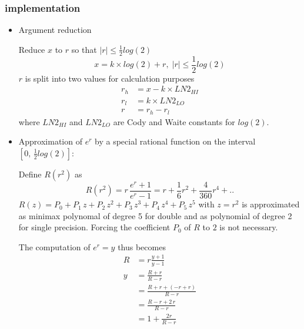 \documentclass[10pt,a4paper]{article}
\numberwithin{equation}{subsection}
\begin{document}
\subsubsection{implementation}
\begin{itemize}
\item Argument reduction

    Reduce $x$ to $r$ so that $ |r| \le \frac{1}{2} log(2) $
    \begin{equation}
        x = k \times log(2) + r, \; |r| \le \frac{1}{2} log(2)
    \end{equation}
    $r$ is split into two values for calculation purposes
    \[
       \begin{aligned}
       r_h &= x - k \times LN2_{HI} \\
       r_l &= k \times LN2_{LO} \\
       r &= r_h - r_l
       \end{aligned}
    \]
    where $LN2_{HI}$ and $LN2_{LO}$ are Cody and Waite constants for $log(2)$.

\item Approximation of $e^r$ by a special rational function on the interval
    $[0,\,\frac{1}{2}log(2)]$:

    Define $ R(r^2) $ as
    \begin{equation}
        R(r^2) = r \, \frac{e^r+1}{e^r-1}
               = r + \frac{1}{6}r^2 + \frac{4}{360}r^4 + ..
    \end{equation}
    $ R(z) = P_0 + P_1\, z + P_2\,z^2 + P_3\,z^3 + P_4\,z^4+ P_5\, z^5$
    with $z = r^2$ is approximated as minimax polynomal of degree 5 for double
    and as polynomial of degree 2 for single precision.
    Forcing the coefficient $P_0$ of $R$ to $2$ is not necessary.

    The computation of $e^r=y$ thus becomes
    \[
        \begin{aligned}
            R &= r \frac{y+1}{y-1} \\
            y &= \frac{R+r}{R-r} \\
              &= \frac{R+r+(-r+r)}{R-r} \\
              &= \frac{R-r+2\,r}{R-r}\\
              &= 1 + \frac{2 r}{R-r}
        \end{aligned}
    \]


\end{itemize}
\end{document}
